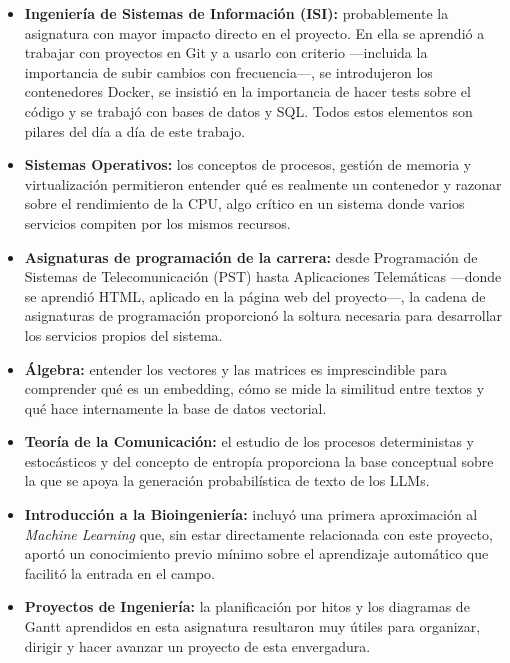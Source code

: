 \begin{itemize}
    \item \textbf{Ingeniería de Sistemas de Información (ISI):} probablemente la asignatura con mayor impacto directo en el proyecto. En ella se aprendió a trabajar con proyectos en Git y a usarlo con criterio ---incluida la importancia de subir cambios con frecuencia---, se introdujeron los contenedores Docker, se insistió en la importancia de hacer tests sobre el código y se trabajó con bases de datos y SQL. Todos estos elementos son pilares del día a día de este trabajo.

    \item \textbf{Sistemas Operativos:} los conceptos de procesos, gestión de memoria y virtualización permitieron entender qué es realmente un contenedor y razonar sobre el rendimiento de la CPU, algo crítico en un sistema donde varios servicios compiten por los mismos recursos.

    \item \textbf{Asignaturas de programación de la carrera:} desde Programación de Sistemas de Telecomunicación (PST) hasta Aplicaciones Telemáticas ---donde se aprendió HTML, aplicado en la página web del proyecto---, la cadena de asignaturas de programación proporcionó la soltura necesaria para desarrollar los servicios propios del sistema.

    \item \textbf{Álgebra:} entender los vectores y las matrices es imprescindible para comprender qué es un embedding, cómo se mide la similitud entre textos y qué hace internamente la base de datos vectorial.

    \item \textbf{Teoría de la Comunicación:} el estudio de los procesos deterministas y estocásticos y del concepto de entropía proporciona la base conceptual sobre la que se apoya la generación probabilística de texto de los LLMs.

    \item \textbf{Introducción a la Bioingeniería:} incluyó una primera aproximación al \textit{Machine Learning} que, sin estar directamente relacionada con este proyecto, aportó un conocimiento previo mínimo sobre el aprendizaje automático que facilitó la entrada en el campo.

    \item \textbf{Proyectos de Ingeniería:} la planificación por hitos y los diagramas de Gantt aprendidos en esta asignatura resultaron muy útiles para organizar, dirigir y hacer avanzar un proyecto de esta envergadura.
\end{itemize}

